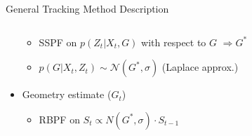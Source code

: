 \documentclass[final,hyperref={pdfpagelabels=false}]{beamer}
\begin{document}
\begin{frame}[t]
\begin{columns}[t]
\begin{column}{0.47\textwidth}
\begin{block}{General Tracking Method Description}
\begin{columns}[t]
\begin{column}{0.48\textwidth}
\begin{itemize}
\begin{itemize}
		\item SSPF on $p(Z_t|X_t,G)$ with respect to $G$ $\Rightarrow G^*$
		\item $p(G|X_t,Z_t) \sim \mathcal{N}(G^*,\sigma)$ (Laplace approx.)
		\end{itemize}
		\item Geometry estimate ($G_t$)
		\begin{itemize}
		\item RBPF on $S_t \propto N(G^*,\sigma) \cdot S_{t-1}$
		\end{itemize}
		\end{itemize}
	\end{column}
\end{columns}


\end{block}


\end{column} %

\begin{column}{.02\textwidth}\end{column} %
 
\begin{column}{.48\textwidth} %




\end{column}
\end{columns}
\end{frame}
\end{document}
